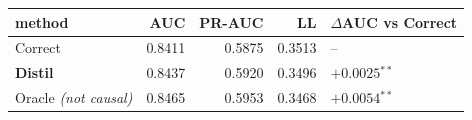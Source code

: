 \begin{tabular}{lrrrl}
\toprule
method & AUC & PR-AUC & LL & $\Delta$AUC vs Correct\\
\midrule
Correct & 0.8411 & 0.5875 & 0.3513 & --\\
\textbf{Distil} & 0.8437 & 0.5920 & 0.3496 & $+0.0025$$^{\ast\ast}$\\
\midrule
Oracle \emph{(not causal)} & 0.8465 & 0.5953 & 0.3468 & $+0.0054$$^{\ast\ast}$\\
\bottomrule
\end{tabular}
